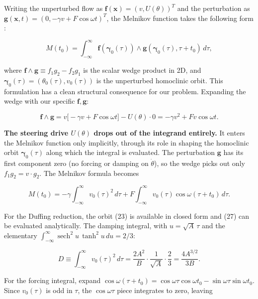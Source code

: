 \documentclass[11pt]{article}
\begin{document}
Writing the unperturbed flow as $\mathbf{f}(\mathbf{x}) = (v, U(\theta))^T$ and the perturbation as $\mathbf{g}(\mathbf{x}, t) = (0, -\gamma v + F\cos\omega t)^T$, the Melnikov function takes the following form \cite[§4.5]{guckenheimer1983}:

\begin{equation}
M(t_0) = \int_{-\infty}^{\infty} \mathbf{f}(\boldsymbol{\gamma}_0(\tau)) \wedge \mathbf{g}(\boldsymbol{\gamma}_0(\tau), \tau + t_0)\,d\tau,
\end{equation}

where $\mathbf{f} \wedge \mathbf{g} \equiv f_1 g_2 - f_2 g_1$ is the scalar wedge product in 2D, and $\boldsymbol{\gamma}_0(\tau) = (\theta_0(\tau), v_0(\tau))$ is the unperturbed homoclinic orbit. This formulation has a clean structural consequence for our problem. Expanding the wedge with our specific $\mathbf{f}, \mathbf{g}$:

\begin{equation}
\mathbf{f} \wedge \mathbf{g} = v\bigl[-\gamma v + F\cos\omega t\bigr] - U(\theta)\cdot 0 = -\gamma v^2 + F v\cos\omega t.
\end{equation}

\textbf{The steering drive $U(\theta)$ drops out of the integrand entirely.} It enters the Melnikov function only implicitly, through its role in shaping the homoclinic orbit $\boldsymbol{\gamma}_0(\tau)$ along which the integral is evaluated. The perturbation $\mathbf{g}$ has its first component zero (no forcing or damping on $\dot\theta$), so the wedge picks out only $f_1 g_2 = v\cdot g_2$. The Melnikov formula becomes

\begin{equation}
M(t_0) = -\gamma\int_{-\infty}^{\infty} v_0(\tau)^2\,d\tau + F\int_{-\infty}^{\infty} v_0(\tau)\cos\omega(\tau + t_0)\,d\tau.
\end{equation}

For the Duffing reduction, the orbit (23) is available in closed form and (27) can be evaluated analytically. The damping integral, with $u = \sqrt{A}\,\tau$ and the elementary $\int_{-\infty}^{\infty}\operatorname{sech}^2 u\,\tanh^2 u\,du = 2/3$:

\begin{equation}
D \equiv \int_{-\infty}^{\infty} v_0(\tau)^2\,d\tau = \frac{2A^2}{B}\cdot\frac{1}{\sqrt{A}}\cdot\frac{2}{3} = \frac{4A^{3/2}}{3B}.
\end{equation}

For the forcing integral, expand $\cos\omega(\tau + t_0) = \cos\omega\tau\cos\omega t_0 - \sin\omega\tau\sin\omega t_0$. Since $v_0(\tau)$ is odd in $\tau$, the $\cos\omega\tau$ piece integrates to zero, leaving
\end{document}
